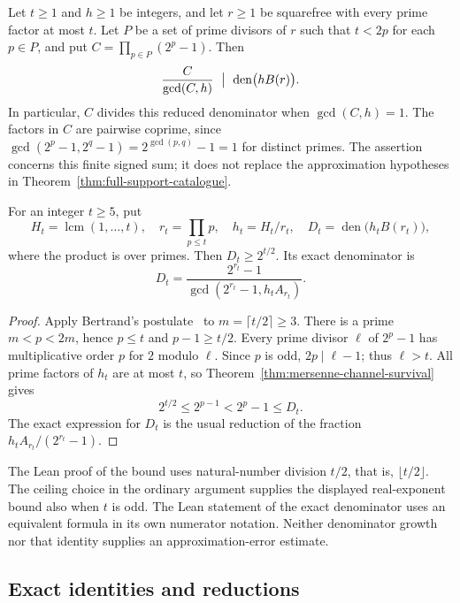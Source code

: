 \begin{thm}
\label{thm:mersenne-channel-survival}
Let $t\ge1$ and $h\ge1$ be integers, and let $r\ge1$ be
squarefree with every prime factor at most $t$.  Let $P$ be a set of
prime divisors of $r$ such that $t<2p$ for each $p\in P$, and put
$C=\prod_{p\in P}(2^p-1)$.  Then
\[
 \frac{C}{\gcd(C,h)}\ \bigm|\ \operatorname{den}\bigl(hB(r)\bigr).
\]
In particular, $C$ divides this reduced denominator when
$\gcd(C,h)=1$.  The factors in $C$ are pairwise coprime, since
$\gcd(2^p-1,2^q-1)=2^{\gcd(p,q)}-1=1$ for distinct primes.
The assertion concerns this finite signed sum; it does not replace
the approximation hypotheses in Theorem~\ref{thm:full-support-catalogue}.
\end{thm}

\begin{thm}
\label{thm:mersenne-channel-growth}
For an integer $t\ge5$, put
\[
 H_t=\operatorname{lcm}(1,\ldots,t),\quad
 r_t=\prod_{p\le t}p,\quad h_t=H_t/r_t,\quad
 D_t=\operatorname{den}\bigl(h_tB(r_t)\bigr),
\]
where the product is over primes.  Then $D_t\ge2^{t/2}$.
Its exact denominator is
\[
 D_t=\frac{2^{r_t}-1}{\gcd(2^{r_t}-1,h_tA_{r_t})}.
\]
\end{thm}
\begin{proof}
Apply Bertrand's postulate~\cite[\S\S4--5, pp.~197--198]{erdos1932bertrand} to $m=\lceil t/2\rceil\ge3$.
There is a prime $m<p<2m$, hence $p\le t$ and $p-1\ge t/2$.
Every prime divisor $\ell$ of $2^p-1$ has multiplicative order
$p$ for $2$ modulo $\ell$.  Since $p$ is odd, $2p\mid\ell-1$;
thus $\ell>t$.  All prime factors of $h_t$ are at most $t$, so
Theorem~\ref{thm:mersenne-channel-survival} gives
\[
 2^{t/2}\le2^{p-1}<2^p-1\le D_t.
\]
The exact expression for $D_t$ is the usual reduction of the
fraction $h_tA_{r_t}/(2^{r_t}-1)$.
\end{proof}
The Lean proof of the bound uses natural-number division $t/2$,
that is, $\lfloor t/2\rfloor$.  The ceiling choice in the ordinary
argument supplies the displayed real-exponent bound also when $t$
is odd.  The Lean statement of the exact denominator uses an
equivalent formula in its own numerator notation.  Neither denominator growth nor
that identity supplies an approximation-error estimate.

\subsection{Exact identities and reductions}

